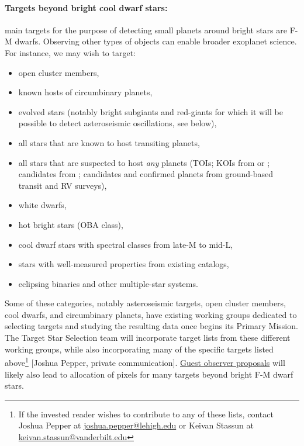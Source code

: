 \paragraph{Targets beyond bright cool dwarf stars:}
\tesss main targets for the purpose of detecting small planets around bright stars are F-M dwarfs.
Observing other types of objects can enable broader exoplanet science.
For instance, we may wish to target:
\begin{itemize}
	\item open cluster members,
	\item known hosts of circumbinary planets,
	\item evolved stars (notably bright subgiants and red-giants for which it will be possible to detect asteroseismic oscillations, see below),
	\item all stars that are known to host transiting planets,
	\item all stars that are suspected to host \textit{any} planets (TOIs; KOIs from \kepler or \ktwo; candidates from \corot\!; candidates and confirmed planets from ground-based transit and RV surveys),
	\item white dwarfs,
	\item hot bright stars (OBA class),
	\item cool dwarf stars with spectral classes from late-M to mid-L,
	\item stars with well-measured properties from existing catalogs,

	\item eclipsing binaries and other multiple-star systems.
\end{itemize}
Some of these categories, notably asteroseismic targets, open cluster members, cool dwarfs, and circumbinary planets, have existing working groups dedicated to selecting targets and studying the resulting data once \tess begins its Primary Mission.
The \tess Target Star Selection team will incorporate target lists from these different working groups, while also incorporating many of the specific targets listed above\footnote{If the invested reader wishes to contribute to any of these lists, contact Joshua Pepper at \href{mailto:joshua.pepper@lehigh.edu}{joshua.pepper@lehigh.edu} or Keivan Stassun at \href{mailto:keivan.stassun@vanderbilt.edu}{keivan.stassun@vanderbilt.edu}} [Joshua Pepper, private communication].
\href{https://heasarc.gsfc.nasa.gov/docs/tess/}{Guest observer proposals} will likely also lead to allocation of pixels for many targets beyond bright F-M dwarf stars.

